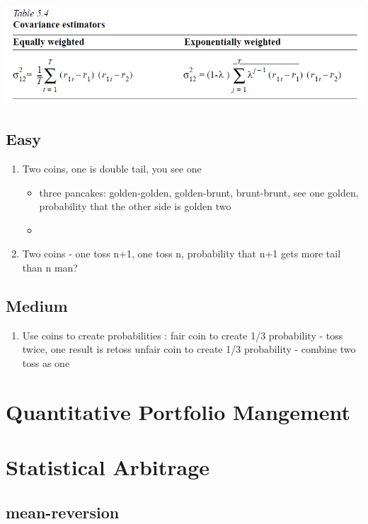 \documentclass[11pt, openany]{book}              %
\begin{document}
\includegraphics[scale=0.5]{Cov.JPG}

\section{Easy}
\begin{enumerate}
 \item Two coins, one is double tail, you see one \\
  \begin{itemize}
    \item three pancakes: golden-golden, golden-brunt, brunt-brunt, see one golden, probability that the other side is golden two
    \item 
   \end{itemize}
 \item Two coins - one toss n+1, one toss n, probability that n+1 gets more tail than n man?
\end{enumerate}


\section{Medium}
\begin{enumerate}
	\item Use coins to create probabilities : fair coin to create 1/3 probability - toss twice, one result is retoss
unfair coin to create 1/3 probability - combine two toss as one


 \end{enumerate}
 
\chapter{Quantitative Portfolio Mangement}

\chapter{Statistical Arbitrage}

\section{mean-reversion}
\end{document}
